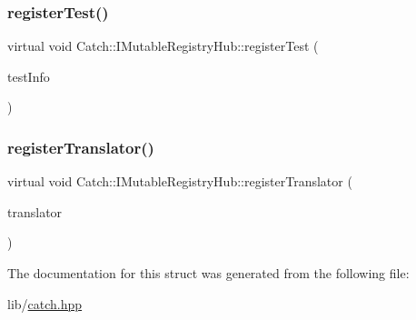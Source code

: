 \hypertarget{struct_catch_1_1_i_mutable_registry_hub_a11b85c6744d88c9f83fe16ad4a8dd451}{}\label{struct_catch_1_1_i_mutable_registry_hub_a11b85c6744d88c9f83fe16ad4a8dd451} 
\subsubsection{\texorpdfstring{register\+Test()}{registerTest()}}
{\footnotesize\ttfamily virtual void Catch\+::\+I\+Mutable\+Registry\+Hub\+::register\+Test (\begin{DoxyParamCaption}\item[{\hyperlink{class_catch_1_1_test_case}{Test\+Case} const \&}]{test\+Info }\end{DoxyParamCaption})\hspace{0.3cm}{\ttfamily [pure virtual]}}

\hypertarget{struct_catch_1_1_i_mutable_registry_hub_ae6825365102693cf7707db022a2c2b49}{}\label{struct_catch_1_1_i_mutable_registry_hub_ae6825365102693cf7707db022a2c2b49} 
\subsubsection{\texorpdfstring{register\+Translator()}{registerTranslator()}}
{\footnotesize\ttfamily virtual void Catch\+::\+I\+Mutable\+Registry\+Hub\+::register\+Translator (\begin{DoxyParamCaption}\item[{const \hyperlink{struct_catch_1_1_i_exception_translator}{I\+Exception\+Translator} $\ast$}]{translator }\end{DoxyParamCaption})\hspace{0.3cm}{\ttfamily [pure virtual]}}



The documentation for this struct was generated from the following file\+:\begin{DoxyCompactItemize}
\item 
lib/\hyperlink{catch_8hpp}{catch.\+hpp}\end{DoxyCompactItemize}
